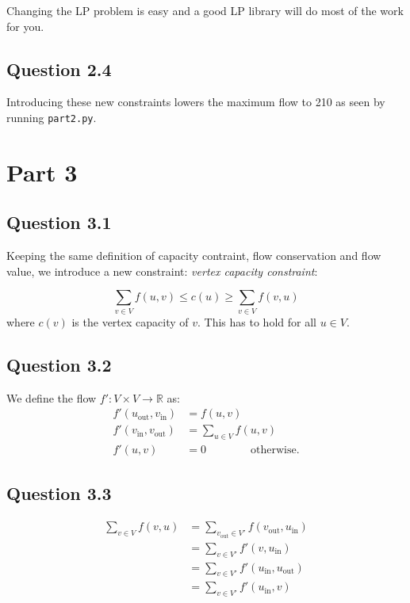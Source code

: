 \documentclass{sig-alternate}
\begin{document}
Changing the LP problem is easy and a good LP library will do most of the
work for you.

\subsection*{Question 2.4}

Introducing these new constraints lowers the maximum flow to 210 as seen by
running \verb+part2.py+.

\section{Part 3}

\subsection*{Question 3.1}


Keeping the same definition of capacity contraint, flow conservation and
flow value, we introduce a new constraint: \textit{vertex capacity constraint}:

\[
\sum_{v\in V} f(u, v) \le c(u) \ge \sum_{v\in V} f(v, u)
\] where $c(v)$ is the vertex capacity of $v$. This has to hold for all $u\in V$.

\subsection*{Question 3.2}

We define the flow $f' : V \times V \to \mathbb{R}$ as:
\begin{align}
    \label{eq1} f'(u_{\text{out}}, v_{\text{in}}) &= f(u,v) \\
    \label{eq2} f'(v_{\text{in}}, v_{\text{out}}) &= \sum_{u\in V} f(u, v) \\
    \label{eq3} f'(u,v) &= 0 \qquad\qquad\text{otherwise.}
\end{align}

\subsection*{Question 3.3}

\begin{align}
    \label{eq4} \sum_{v\in V} f(v,u) &= \sum_{v_{\text{out}} \in V'} f(v_{\text{out}}, u_{\text{in}}) \\
    \label{eq5} &= \sum_{v \in V'} f'(v, u_{\text{in}}) \\
    \label{eq6} &= \sum_{v \in V'} f'(u_{\text{in}}, u_{\text{out}}) \\
    \label{eq7} &= \sum_{v \in V'} f'(u_{\text{in}}, v)
\end{align}
\end{document}
